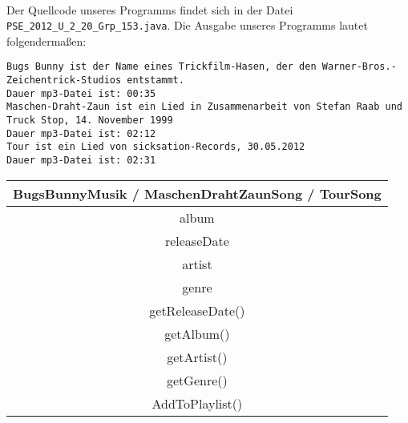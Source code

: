 \documentclass[a4paper]{scrartcl}
\begin{document}
\setcounter{aufgabe}{3}
\begin{aufgabe}~

	Der Quellcode unseres Programms findet sich in der Datei \verb|PSE_2012_U_2_20_Grp_153.java|.
	Die Ausgabe unseres Programms lautet folgendermaßen:

	\begin{lstlisting}[breaklines]
Bugs Bunny ist der Name eines Trickfilm-Hasen, der den Warner-Bros.-Zeichentrick-Studios entstammt.
Dauer mp3-Datei ist: 00:35
Maschen-Draht-Zaun ist ein Lied in Zusammenarbeit von Stefan Raab und Truck Stop, 14. November 1999
Dauer mp3-Datei ist: 02:12
Tour ist ein Lied von sicksation-Records, 30.05.2012
Dauer mp3-Datei ist: 02:31
	\end{lstlisting}

\end{aufgabe}

\begin{aufgabe}
	
	\begin{table}[h]
		\centering
		\begin{tabular}{|c|}
			\hline
			BugsBunnyMusik / MaschenDrahtZaunSong / TourSong \\ \hline
			album \\
			releaseDate \\
			artist \\
			genre \\ 
			\hline
			getReleaseDate() \\
			getAlbum() \\
			getArtist() \\
			getGenre() \\
			AddToPlaylist() \\ \hline
		\end{tabular}
	\end{table}
\end{aufgabe}
\end{document}
